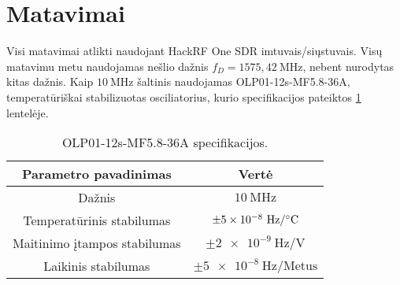 \documentclass[../gnss_interference_resistant_thesis.tex]{subfiles}
\begin{document}
\section{Matavimai}

Visi matavimai atlikti naudojant HackRF One SDR
imtuvais/siųstuvais. Visų matavimu metu naudojamas nešlio dažnis
$f_D = 1575,42\ \mathrm{MHz}$, nebent nurodytas kitas dažnis.
Kaip $10\ \mathrm{MHz}$ šaltinis
naudojamas OLP01-12s-MF5.8-36A, temperatūriškai stabilizuotas osciliatorius,
kurio specifikacijos pateiktos \ref{tab:clock_source_spec} lentelėje.


\begin{table}[h]
    \protect\caption{\label{tab:clock_source_spec}OLP01-12s-MF5.8-36A specifikacijos.}
    \centering{}%
    \begin{tabular}{| c | c |}
    \hline
    Parametro pavadinimas & Vertė \\
    \hline
    Dažnis                         & $10\ \mathrm{MHz}$ \\
    Temperatūrinis stabilumas      & $\pm \num{5e-8}\ \mathrm{Hz/\degree C}$ \\
    Maitinimo įtampos stabilumas   & $\pm \num{2e-9}\ \mathrm{Hz/V}$ \\
    Laikinis stabilumas             & $\pm \num{5e-8}\ \mathrm{Hz/Metus}$ \\
    \hline
    \end{tabular}
\end{table}



% 
\end{document}
